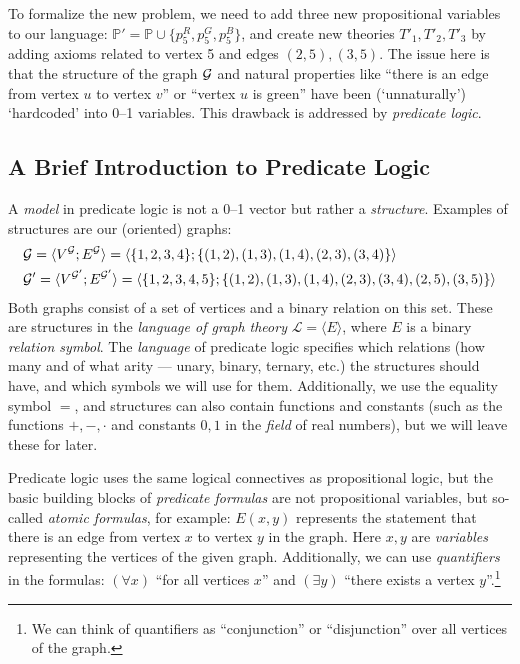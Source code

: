 To formalize the new problem, we need to add three new propositional variables to our language: \(\mathbb{P'} = \mathbb{P} \cup \{ p_5^R, p_5^G, p_5^B \} \), and create new theories \( T'_1, T'_2, T'_3 \) by adding axioms related to vertex 5 and edges \( (2, 5), (3, 5) \). The issue here is that the structure of the graph \( \mathcal{G} \) and natural properties like ``there is an edge from vertex \( u \) to vertex \( v \)'' or ``vertex \( u \) is green'' have been (`unnaturally') `hardcoded' into 0--1 variables. This drawback is addressed by \emph{predicate logic}.


\subsection{A Brief Introduction to Predicate Logic}

A \emph{model} in predicate logic is not a 0--1 vector but rather a \emph{structure}. Examples of structures are our (oriented) graphs:
\begin{align*}
    &\mathcal{G} = \langle V^{\mathcal{G}}; E^{\mathcal{G}} \rangle = \langle \{1, 2, 3, 4\}; \{(1, 2), (1, 3), (1, 4), (2, 3), (3, 4)\} \rangle \\ 
    &\mathcal{G}' = \langle V^{\mathcal{G}'}; E^{\mathcal{G}'} \rangle = \langle \{1, 2, 3, 4, 5\}; \{(1, 2), (1, 3), (1, 4), (2, 3), (3, 4), (2, 5), (3, 5)\} \rangle
\end{align*}
Both graphs consist of a set of vertices and a binary relation on this set. These are structures in the \emph{language of graph theory} \( \mathcal{L} = \langle E \rangle \), where \(E\) is a binary \emph{relation symbol}. The \emph{language} of predicate logic specifies which relations (how many and of what arity — unary, binary, ternary, etc.) the structures should have, and which symbols we will use for them. Additionally, we use the equality symbol \(=\), and structures can also contain functions and constants (such as the functions \( +, -, \cdot \) and constants \( 0, 1 \) in the \emph{field} of real numbers), but we will leave these for later.

Predicate logic uses the same logical connectives as propositional logic, but the basic building blocks of \emph{predicate formulas} are not propositional variables, but so-called \emph{atomic formulas}, for example: \( E(x, y) \) represents the statement that there is an edge from vertex \( x \) to vertex \( y \) in the graph. Here \( x, y \) are \emph{variables} representing the vertices of the given graph. Additionally, we can use \emph{quantifiers} in the formulas: \( (\forall x) \) ``for all vertices \( x \)'' and \( (\exists y) \) ``there exists a vertex \( y \)''.\footnote{We can think of quantifiers as ``conjunction'' or ``disjunction'' over all vertices of the graph.}


